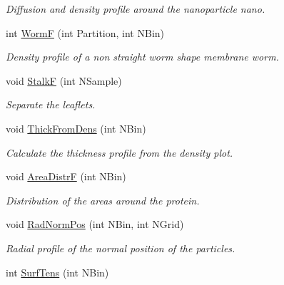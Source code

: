 \begin{DoxyCompactItemize}
\begin{DoxyCompactList}\small\item\em \-Diffusion and density profile around the nanoparticle  nano. \end{DoxyCompactList}\item 
\hypertarget{classElPoly_ad6fa03abf69921d9a0759689569e35e9}{int \hyperlink{classElPoly_ad6fa03abf69921d9a0759689569e35e9}{\-Worm\-F} (int \-Partition, int \-N\-Bin)}\label{classElPoly_ad6fa03abf69921d9a0759689569e35e9}

\begin{DoxyCompactList}\small\item\em \-Density profile of a non straight worm shape membrane  worm. \end{DoxyCompactList}\item 
\hypertarget{classElPoly_aba321cce3649252deca41a462b0e3d38}{void \hyperlink{classElPoly_aba321cce3649252deca41a462b0e3d38}{\-Stalk\-F} (int \-N\-Sample)}\label{classElPoly_aba321cce3649252deca41a462b0e3d38}

\begin{DoxyCompactList}\small\item\em \-Separate the leaflets. \end{DoxyCompactList}\item 
void \hyperlink{classElPoly_abcf175509352ac9dd90cb8ad96494219}{\-Thick\-From\-Dens} (int \-N\-Bin)
\begin{DoxyCompactList}\small\item\em \-Calculate the thickness profile from the density plot. \end{DoxyCompactList}\item 
\hypertarget{classElPoly_a16d58960eae98f1ad67971068f12a22c}{void \hyperlink{classElPoly_a16d58960eae98f1ad67971068f12a22c}{\-Area\-Distr\-F} (int \-N\-Bin)}\label{classElPoly_a16d58960eae98f1ad67971068f12a22c}

\begin{DoxyCompactList}\small\item\em \-Distribution of the areas around the protein. \end{DoxyCompactList}\item 
\hypertarget{classElPoly_ad3a244bc00c2c8216b1f5cbd36699cdc}{void \hyperlink{classElPoly_ad3a244bc00c2c8216b1f5cbd36699cdc}{\-Rad\-Norm\-Pos} (int \-N\-Bin, int \-N\-Grid)}\label{classElPoly_ad3a244bc00c2c8216b1f5cbd36699cdc}

\begin{DoxyCompactList}\small\item\em \-Radial profile of the normal position of the particles. \end{DoxyCompactList}\item 
\hypertarget{classElPoly_af9a44196e456df096e96d914e19d85c9}{int \hyperlink{classElPoly_af9a44196e456df096e96d914e19d85c9}{\-Surf\-Tens} (int \-N\-Bin)}\label{classElPoly_af9a44196e456df096e96d914e19d85c9}


\end{DoxyCompactItemize}

